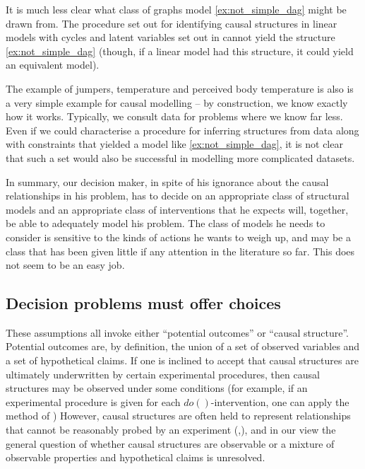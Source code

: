 It is much less clear what class of graphs model \eqref{ex:not_simple_dag} might be drawn from. The procedure set out for identifying causal structures in linear models with cycles and latent variables set out in \citet{eberhardt_combining_2010} cannot yield the structure \eqref{ex:not_simple_dag} (though, if a linear model had this structure, it could yield an equivalent model).

The example of jumpers, temperature and perceived body temperature is also is a very simple example for causal modelling -- by construction, we know exactly how it works. Typically, we consult data for problems where we know far less. Even if we could characterise a procedure for inferring structures from data along with constraints that yielded a model like \eqref{ex:not_simple_dag}, it is not clear that such a set would also be successful in modelling more complicated datasets.

In summary, our decision maker, in spite of his ignorance about the causal relationships in his problem, has to decide on an appropriate class of structural models and an appropriate class of interventions that he expects will, together, be able to adequately model his problem. The class of models he needs to consider is sensitive to the kinds of actions he wants to weigh up, and may be a class that has been given little if any attention in the literature so far. This does not seem to be an easy job.

\subsection{Decision problems must offer choices}



These assumptions all invoke either ``potential outcomes'' or ``causal structure''. Potential outcomes are, by definition, the union of a set of observed variables and a set of hypothetical claims. If one is inclined to accept that causal structures are ultimately underwritten by certain experimental procedures, then causal structures may be observed under some conditions (for example, if an experimental procedure is given for each $do()$-intervention, one can apply the method of \citep{eberhardt_almost_2008}) However, causal structures are often held to represent relationships that cannot be reasonably probed by an experiment (\citep[Chap. ~11]{pearl_causality:_2009},\citet{pearl_does_2018}), and in our view the general question of whether causal structures are observable or a mixture of observable properties and hypothetical claims is unresolved.

